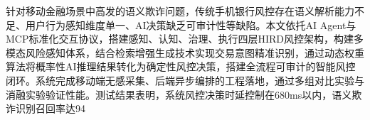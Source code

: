 针对移动金融场景中高发的语义欺诈问题，传统手机银行风控存在语义解析能力不足、用户行为感知维度单一、AI决策缺乏可审计性等缺陷。本文依托AI Agent与MCP标准化交互协议，搭建感知、认知、治理、执行四层HIRD风控架构，构建多模态风险感知体系，结合检索增强生成技术实现交易意图精准识别，通过动态权重算法将概率性AI推理结果转化为确定性风控决策，搭建全流程可审计的智能风控闭环。系统完成移动端无感采集、后端异步编排的工程落地，通过多组对比实验与消融实验验证性能。测试结果表明，系统风控决策时延控制在680ms以内，语义欺诈识别召回率达94%